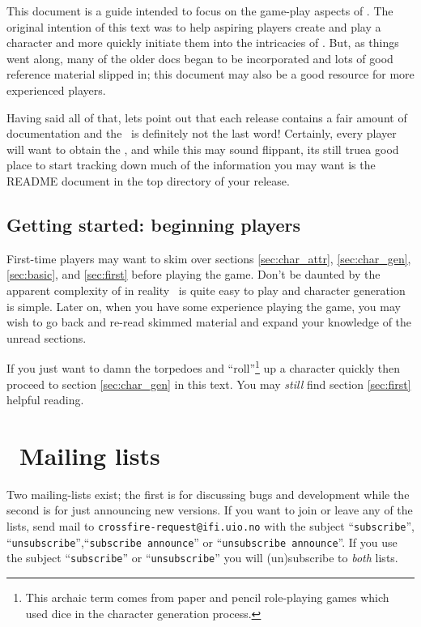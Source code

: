 This document is a guide intended to focus on the game-play aspects of \cf . 
The original intention of this text was to 
help aspiring players create and play a character and more quickly initiate
them into the intricacies of \cf . But, as things went along, many of the 
older docs began to be incorporated and lots of good reference material 
slipped in; this document may also be a good resource for more experienced 
players.

Having said all of that, lets point out that each release contains
a fair amount of documentation and the \playbook\ is definitely not the 
last word! Certainly, every player will want to obtain the \spoiler , 
and while this may sound flippant, its still true\emdash a good place to 
start tracking down much of the information you may want is the 
README document in the top directory of your release.


\subsection{Getting started: beginning players} 

First-time players may want to skim over sections 
\ref{sec:char_attr}, \ref{sec:char_gen}, \ref{sec:basic},
and \ref{sec:first} before playing the game. Don't be daunted by 
the apparent complexity of \cf \emdash in reality \cf\ is quite easy 
to play and character generation
is simple. Later on, when you have some experience
playing the game, you may wish to go back and re-read skimmed material
and expand your knowledge of the unread sections. 

If you just want to damn the torpedoes and ``roll''\footnote{This archaic 
term comes from paper and pencil role-playing games which used dice in 
the character generation process.} up a character quickly then proceed 
to section \ref{sec:char_gen} in this text. You may {\em still} 
find section \ref{sec:first} helpful reading. 


\section{\cf\ Mailing lists}\label{sec:mlist} 

Two mailing-lists exist; the first is for discussing bugs and
development while the second is for just announcing new versions.
If you want to join or leave any of the lists, send mail to
{\tt crossfire-}{\tt request@}{\tt ifi.uio.no} with the subject ``{\tt subscribe}'',
``{\tt unsubscribe}'',``{\tt subscribe announce}'' or ``{\tt unsubscribe 
announce}''.  If you use the subject ``{\tt subscribe}'' or 
``{\tt unsubscribe}'' you will (un)subscribe to {\em both} lists.

